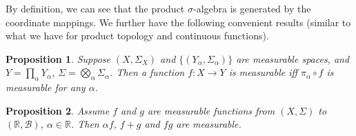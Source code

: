 \documentclass[openany]{book}
\newtheorem{proposition}{Proposition}[chapter]
\theoremstyle{definition}
\theoremstyle{remark}
\begin{document}
By definition, we can see that the product $\sigma$-algebra is generated by the coordinate mappings. We further have the following convenient results (similar to what we have for product topology and continuous functions).
\begin{proposition}
    Suppose $(X,\Sigma_X)$ and $\{(Y_{\alpha},\Sigma_{\alpha})\}$ are measurable spaces, and $Y=\prod_{\alpha}Y_{\alpha}$, $\Sigma=\bigotimes_{\alpha}\Sigma_{\alpha}$. Then a function $f:X\to Y$ is measurable iff $\pi_{\alpha}\circ f$ is measurable for any $\alpha$.
\end{proposition}
\begin{proposition}
    Assume $f$ and $g$ are measurable functions from $(X,\Sigma)$ to $(\mathbb{R},\mathcal{B})$, $\alpha\in \mathbb{R}$. Then $\alpha f$, $f+g$ and $fg$ are measurable.
\end{proposition}
\end{document}
